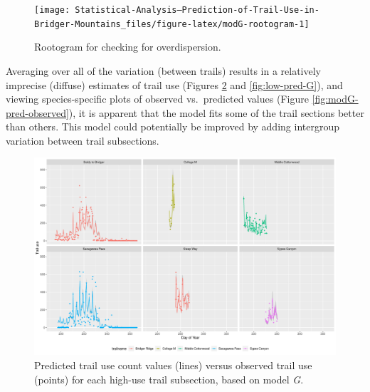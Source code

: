 \documentclass[
]{book}
\newenvironment{Shaded}{\begin{snugshade}}{\end{snugshade}}
\newcommand{\FunctionTok}[1]{\textcolor[rgb]{0.00,0.00,0.00}{#1}}
\newcommand{\NormalTok}[1]{#1}
\newcommand{\OtherTok}[1]{\textcolor[rgb]{0.56,0.35,0.01}{#1}}
\newcommand{\SpecialCharTok}[1]{\textcolor[rgb]{0.00,0.00,0.00}{#1}}
\begin{document}
\begin{Shaded}
\end{Shaded}

\begin{figure}

{\centering \texttt{[image: Statistical-Analysis--Prediction-of-Trail-Use-in-Bridger-Mountains\_files/figure-latex/modG-rootogram-1]} 

}

\caption{Rootogram for checking for overdispersion.}\label{fig:modG-rootogram}
\end{figure}

Averaging over all of the variation (between trails) results in a relatively imprecise (diffuse) estimates of trail use (Figures \ref{fig:high-pred-G} and \ref{fig:low-pred-G}), and viewing species-specific plots of observed vs.~predicted values (Figure \ref{fig:modG-pred-observed}), it is apparent that the model fits some of the trail sections better than others. This model could potentially be improved by adding intergroup variation between trail subsections.

\begin{figure}

{\centering \includegraphics[width=1\linewidth]{../figures/high_pred_modG} 

}

\caption{Predicted trail use count values (lines) versus observed trail use (points) for each high-use trail subsection, based on model \emph{G}.}\label{fig:high-pred-G}
\end{figure}
\end{document}
